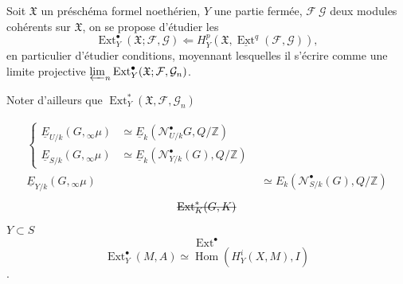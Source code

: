Soit  $\mathfrak X$ un préschéma formel noethérien, $Y$ une partie fermée, $\mathcal F\ \mathcal G$ deux modules cohérents sur $\mathfrak X$, on se propose d'étudier les
\[
 \operatorname{Ext}^{\bullet}_Y(\mathfrak X;\mathcal F,\mathcal G)
 \Longleftarrow H^p_Y(\mathfrak X,\underline{\operatorname{Ext}}^q(\mathcal F,\mathcal G)),
\]
en particulier d'étudier  conditions, moyennant lesquelles il  s'écrire comme une limite projective $\varprojlim_n\operatorname{Ext}^{\bullet}_{Y}(\mathfrak X;\mathcal F,\mathcal G_n)$.
 
Noter d'ailleurs que $\operatorname{Ext}^{*}_Y(\mathfrak X,\mathcal F,\mathcal G_n)$

\[
\begin{aligned}
 \left\{\begin{aligned}
 \underline E_{U/k}(G,{}_{\infty}\mu)&\simeq\underline E_k(\mathcal N^{\bullet}_{U/k}G,Q/\mathbb Z)\\
 \underline E_{S/k}(G,{}_{\infty}\mu)&\simeq\underline E_k(\mathcal N^{\bullet}_{Y/k}(G),Q/\mathbb Z)
 \end{aligned}\right.&\hspace{0pt}\\[-2pt]
 \underline E_{Y/k}(G,{}_{\infty}\mu)&\simeq E_k(\mathcal N^{\bullet}_{S/k}(G),Q/\mathbb Z)
\end{aligned}
\]
\[
 \deleted{\operatorname{Ext}^{*}_{K}(G,K)}
\]
$Y\subset S$
\[
 \operatorname{Ext}^{\bullet}
\]
\[
 \operatorname{Ext}^{\bullet}_Y(M,A)\simeq\operatorname{Hom}(H_Y^{i}(X,M),I)
\]
$\cdot$

